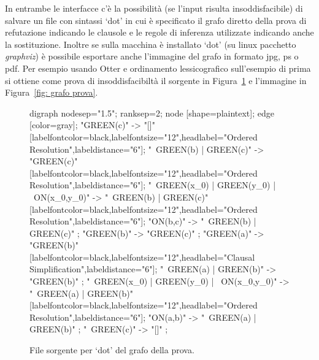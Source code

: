 \documentclass[a4paper,11pt]{article} %
\newenvironment{myfigure}[2]
  {\newcommand{\didascalia}{\caption{#1}}%
   \newcommand{\etichetta}{\label{#2}}%
   \begin{figure}[h!]\centering}
  {\didascalia\etichetta\end{figure}}
\begin{document}
In entrambe le interfacce c'è la possibilità (se l'input risulta insoddisfacibile)
di salvare un file con sintassi `dot' in cui è specificato il grafo diretto
della prova di refutazione indicando le clausole e le regole di inferenza 
utilizzate indicando anche la sostituzione.
Inoltre se sulla macchina è installato `dot' (su linux pacchetto
\emph{graphviz}) è possibile esportare anche l'immagine del grafo in formato
jpg, ps o pdf. 
Per esempio usando Otter e ordinamento lessicografico sull'esempio di prima
si ottiene come prova di insoddisfacibiltà il sorgente in Figura~\ref{fig: src grafo prova} 
e l'immagine in Figura~\ref{fig: grafo prova}.
\vspace{-2ex}
\begin{myfigure}{File sorgente per `dot' del grafo della prova.}{fig: src grafo prova}
\centering
\begin{dotgraph}
digraph {
	nodesep="1.5"; ranksep=2;
	node [shape=plaintext];
	edge [color=gray];
	"GREEN(c)" -> "[]" 
		[labelfontcolor=black,labelfontsize="12",headlabel="Ordered Resolution\n{ }",labeldistance="6"];
	"~GREEN(b) | GREEN(c)" -> "GREEN(c)" 
		[labelfontcolor=black,labelfontsize="12",headlabel="Ordered Resolution\n{ }",labeldistance="6"];
	"~GREEN(x_0) | GREEN(y_0) | ~ON(x_0,y_0)" -> "~GREEN(b) | GREEN(c)" 
		[labelfontcolor=black,labelfontsize="12",headlabel="Ordered Resolution",labeldistance="6"];
	"ON(b,c)" -> "~GREEN(b) | GREEN(c)" ;
	"GREEN(b)" -> "GREEN(c)" ;
	"GREEN(a)" -> "GREEN(b)" 
		[labelfontcolor=black,labelfontsize="12",headlabel="Clausal Simplification\n{ }",labeldistance="6"];
	"~GREEN(a) | GREEN(b)" -> "GREEN(b)" ;
	"~GREEN(x_0) | GREEN(y_0) | ~ON(x_0,y_0)" -> "~GREEN(a) | GREEN(b)" 
		[labelfontcolor=black,labelfontsize="12",headlabel="Ordered Resolution",labeldistance="6"];
	"ON(a,b)" -> "~GREEN(a) | GREEN(b)" ;
	"~GREEN(c)" -> "[]" ;
}
\end{dotgraph}
\end{myfigure}
\vspace{-5ex}
\end{document}
